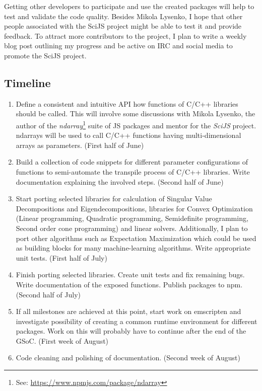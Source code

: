 \documentclass{scrartcl}
\begin{document}
Getting other developers to participate and use the created packages will help to test and validate the code quality. Besides Mikola Lysenko, I hope that other people associated with the SciJS project might be able to test it and provide feedback. To attract more contributors to the project, I plan to write a weekly blog post outlining my progress and be active on IRC and social media to promote the SciJS project.

\subsection*{Timeline}

\begin{enumerate}
\item Define a consistent and intuitive API how functions of C/C++ libraries should be called. This will involve some discussions with Mikola Lysenko, the author of the \emph{ndarray}\footnote{See: \url{https://www.npmjs.com/package/ndarray}} suite of JS packages and mentor for the \emph{SciJS} project. ndarrays will be used to call C/C++ functions having multi-dimensional arrays as parameters. (First half of June) 
\item Build a collection of code snippets for different parameter configurations of functions to semi-automate the transpile process of C/C++ libraries. Write documentation explaining the involved steps. (Second half of June) 
\item Start porting selected libraries for calculation of Singular Value Decompositions and Eigendecompositions, libraries for Convex Optimization (Linear programming, Quadratic programming, Semidefinite programming, Second order cone programming) and linear solvers. Additionally, I plan to port other algorithms such as Expectation Maximization which could be used as building blocks for many machine-learning algorithms. Write appropriate unit tests. (First half of July)
\item Finish porting selected libraries. Create unit tests and fix remaining bugs. Write documentation of the exposed functions. Publish packages to npm. (Second half of July) 
\item If all milestones are achieved at this point, start work on emscripten and investigate possibility of creating a common runtime environment for different packages. Work on this will probably have to continue after the end of the GSoC. (First week of August) 
\item Code cleaning and polishing of documentation. (Second week of August)
\end{enumerate}
\end{document}
